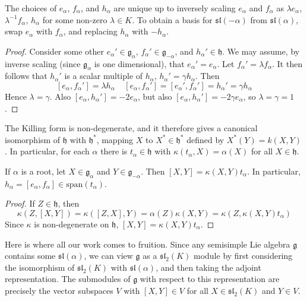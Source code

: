 \begin{theorem}
    The choices of $e_\alpha$, $f_\alpha$, and $h_\alpha$ are unique up to inversely scaling $e_\alpha$ and $f_\alpha$ as $\lambda e_\alpha$, $\lambda^{-1} f_\alpha$, $h_\alpha$ for some non-zero $\lambda \in K$. To obtain a basis for $\mathfrak{sl}(-\alpha)$ from $\mathfrak{sl}(\alpha)$, swap $e_\alpha$ with $f_\alpha$, and replacing $h_\alpha$ with $-h_\alpha$.
\end{theorem}
\begin{proof}
    Consider some other $e_\alpha' \in \mathfrak{g}_\alpha$, $f_\alpha' \in \mathfrak{g}_{-\alpha}$, and $h_\alpha' \in \mathfrak{h}$. We may assume, by inverse scaling (since $\mathfrak{g}_\alpha$ is one dimensional), that $e_\alpha' = e_\alpha$. Let $f_\alpha' = \lambda f_\alpha$. It then follows that $h_\alpha'$ is a scalar multiple of $h_\alpha$, $h_\alpha' = \gamma h_\alpha$. Then
    \[ [e_\alpha, f_\alpha'] = \lambda h_\alpha\ \ \ \ \ [e_\alpha, f_\alpha'] = [e_\alpha', f_\alpha'] = h_\alpha' = \gamma h_\alpha \]
    Hence $\lambda = \gamma$. Also $[e_\alpha, h_\alpha'] = - 2e_\alpha$, but also $[e_\alpha, h_\alpha'] = - 2 \gamma e_\alpha$, so $\lambda = \gamma = 1$.
\end{proof}

The Killing form is non-degenerate, and it therefore gives a canonical isomorphism of $\mathfrak{h}$ with $\mathfrak{h}^*$, mapping $X$ to $X^* \in \mathfrak{h}^*$ defined by $X^*(Y) = k(X,Y)$. In particular, for each $\alpha$ there is $t_\alpha \in \mathfrak{h}$ with $\kappa(t_\alpha,X) = \alpha(X)$ for all $X \in \mathfrak{h}$.

\begin{lemma}
    If $\alpha$ is a root, let $X \in \mathfrak{g}_\alpha$ and $Y \in \mathfrak{g}_{-\alpha}$. Then $[X,Y] = \kappa(X,Y) t_\alpha$. In particular, $h_\alpha = [e_\alpha, f_\alpha] \in \text{span}(t_\alpha)$.
\end{lemma}
\begin{proof}
    If $Z \in \mathfrak{h}$, then
    \[ \kappa(Z,[X,Y]) = \kappa([Z,X],Y) = \alpha(Z) \kappa(X,Y) = \kappa(Z, \kappa(X,Y) t_\alpha) \]
    Since $\kappa$ is non-degenerate on $\mathfrak{h}$, $[X,Y] = \kappa(X,Y) t_\alpha$.
\end{proof}

Here is where all our work comes to fruition. Since any semisimple Lie algebra $\mathfrak{g}$ contains some $\mathfrak{sl}(\alpha)$, we can view $\mathfrak{g}$ as a $\mathfrak{sl}_2(K)$ module by first considering the isomorphism of $\mathfrak{sl}_2(K)$ with $\mathfrak{sl}(\alpha)$, and then taking the adjoint representation. The submodules of $\mathfrak{g}$ with respect to this representation are precisely the vector subspaces $V$ with $[X,Y] \in V$ for all $X \in \mathfrak{sl}_2(K)$ and $Y \in V$.

